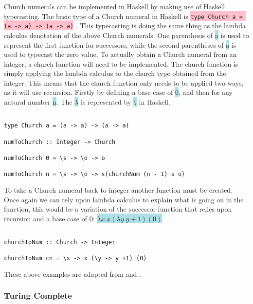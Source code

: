 \documentclass{article}
\begin{document}
Church numerals can be implemented in Haskell by making use of Haskell typecasting. The basic type of a Church numeral in Haskell is  \colorbox{pink}{ \lstinline{type Church a = (a -> a) -> (a -> a)}} \cite{CE}. This typecasting is doing the same thing as the lambda calculus denotation of the above Church numerals. One parenthesis of \colorbox{powderblue}{a} is used to represent the first function for successors, while the second parentheses of \colorbox{powderblue}{a} is used to typecast the zero value. To actually obtain a Church numeral from an integer, a church function will need to be implemented. The church function is simply applying the lambda calculus to the church type obtained from the integer. This means that the church function only needs to be applied two ways, as it will use recursion. Firstly by defining a base case of \colorbox{powderblue}{0}, and then for any natural number \colorbox{powderblue}{n}. The \colorbox{powderblue}{$\lambda$} is represented by \colorbox{powderblue}{\textbackslash} in Haskell. \newline

\begin{lstlisting}

type Church a = (a -> a) -> (a -> a)

numToChurch :: Integer -> Church

numToChurch 0 = \s -> \o -> o

numToChurch n = \s -> \o -> s(churchNum (n - 1) s o)

\end{lstlisting}

To take a Church numeral back to integer another function must be created. Once again we can rely upon lambda calculus to explain what is going on in the function, this would be a variation of the successor function that relies upon recursion and a base case of 0: \colorbox{powderblue}{$\lambda x. x (\lambda y. y + 1)(0)$}. \newline

\begin{lstlisting}

churchToNum :: Church -> Integer

churchToNum cn = \x -> x (\y -> y +1) (0)

\end{lstlisting}

These above examples are adapted from \cite{CE} and \cite{CR}.

\subsubsection{Turing Complete}
\end{document}
